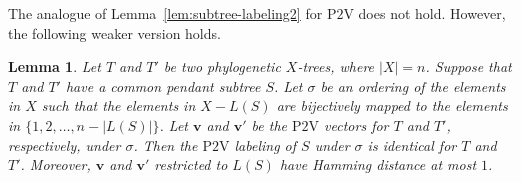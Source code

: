 \documentclass{article}
\newtheorem{lemma}{Lemma}
\newcommand{\PV}{\mathrm{P2V}}
\begin{document}
The analogue of Lemma~\ref{lem:subtree-labeling2} for $\PV$ does not hold. 
However, the following weaker version holds. 

\begin{lemma}
Let $T$ and $T'$ be two phylogenetic $X$-trees, where $|X|=n$. Suppose that $T$ and $T'$ have a common pendant subtree $S$.  Let $\sigma$
be an ordering of the elements in $X$ such that the elements in $X- L(S)$ are bijectively mapped to the elements in $\{1,2,\ldots,n-|L(S)|\}$. 
Let $\mathbf{v}$ and $\mathbf{v}'$  be the $\PV$ vectors for  $T$ and $T'$, respectively, under $\sigma$.
Then the $\PV$  labeling of $S$ under $\sigma$ is identical for $T$ and $T'$. Moreover, $\mathbf{v}$ and $\mathbf{v}'$ restricted to  $L(S)$ have Hamming distance at most $1$.
\label{lem:subtree-labeling3}
\end{lemma}
\end{document}
